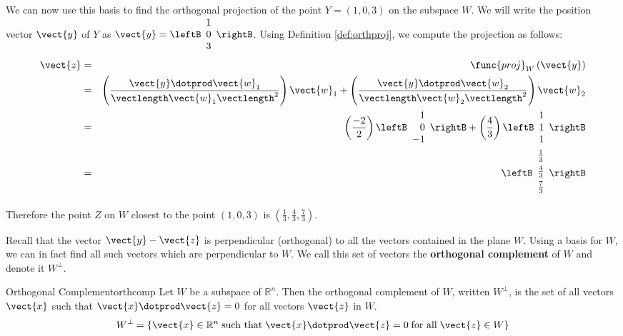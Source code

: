 \begin{solution}
We can now use this basis to find the orthogonal projection of the
point $Y=(1,0,3)$ on the subspace $W$. We will write the position
vector $\vect{y}$ of $Y$ as $\vect{y} = \leftB \begin{array}{c} 1 \\ 0 \\ 3
\end{array} \rightB$. Using Definition \ref{def:orthproj}, we compute the projection as follows:
\begin{eqnarray*}
\vect{z} &=& \func{proj}_{W}\left( \vect{y}\right)\\
&=&
\left( \frac{\vect{y} \dotprod \vect{w}_1}{ \vectlength \vect{w}_1 \vectlength^2}\right) \vect{w}_1
+
\left( \frac{\vect{y} \dotprod \vect{w}_2}{ \vectlength \vect{w}_2 \vectlength^2}\right) \vect{w}_2 \\
&=&
\left( \frac{-2}{2} \right) \leftB
\begin{array}{r}
1 \\
0 \\
-1
\end{array}
\rightB
+
\left( \frac{4}{3} \right)
\leftB
\begin{array}{c}
1 \\
1 \\
1 
\end{array}
\rightB \\
&=& 
\leftB
\begin{array}{c}
\vspace{0.05in}\frac{1}{3} \\
\vspace{0.05in}\frac{4}{3} \\
\vspace{0.05in}\frac{7}{3} 
\end{array}
\rightB
\end{eqnarray*}

Therefore the point $Z$ on $W$ closest to the point $(1,0,3)$  is $\left( \frac{1}{3}, \frac{4}{3}, \frac{7}{3} \right)$. 

\end{solution}

Recall that the vector $\vect{y} - \vect{z}$ is perpendicular
(orthogonal) to all the vectors contained in the plane $W$. Using a
basis for $W$, we can in fact find all such vectors which are
perpendicular to $W$. We call this set of vectors the
\textbf{orthogonal complement} of $W$ and
denote it $W^{\perp}$.

\begin{definition}{Orthogonal Complement}{orthcomp}
Let $W$ be a subspace of $\mathbb{R}^n$. Then the orthogonal
complement of $W$, written $W^{\perp}$, is the set of all vectors
$\vect{x}$ such that $\vect{x} \dotprod \vect{z} = 0$ for all vectors
$\vect{z}$ in $W$.
\[
W^{\perp} = \{ \vect{x} \in \mathbb{R}^n \; \mbox{such that} \;
\vect{x} \dotprod \vect{z} = 0 \; \mbox{for all} \; \vect{z} \in W \}
\]
\end{definition}

